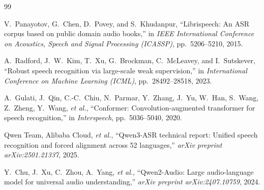 \documentclass[conference]{IEEEtran}
\begin{document}
\begin{thebibliography}{99}

V.~Panayotov, G.~Chen, D.~Povey, and S.~Khudanpur, ``Librispeech: An ASR corpus based on public domain audio books,'' in \textit{IEEE International Conference on Acoustics, Speech and Signal Processing (ICASSP)}, pp.~5206--5210, 2015.

A.~Radford, J.~W.~Kim, T.~Xu, G.~Brockman, C.~McLeavey, and I.~Sutskever, ``Robust speech recognition via large-scale weak supervision,'' in \textit{International Conference on Machine Learning (ICML)}, pp.~28492--28518, 2023.

A.~Gulati, J.~Qin, C.-C.~Chiu, N.~Parmar, Y.~Zhang, J.~Yu, W.~Han, S.~Wang, Z.~Zheng, Y.~Wang, \textit{et al.}, ``Conformer: Convolution-augmented transformer for speech recognition,'' in \textit{Interspeech}, pp.~5036--5040, 2020.

Qwen Team, Alibaba Cloud, \textit{et al.}, ``Qwen3-ASR technical report: Unified speech recognition and forced alignment across 52 languages,'' \textit{arXiv preprint arXiv:2501.21337}, 2025.

Y.~Chu, J.~Xu, C.~Zhou, A.~Yang, \textit{et al.}, ``Qwen2-Audio: Large audio-language model for universal audio understanding,'' \textit{arXiv preprint arXiv:2407.10759}, 2024.

\end{thebibliography}
\end{document}
